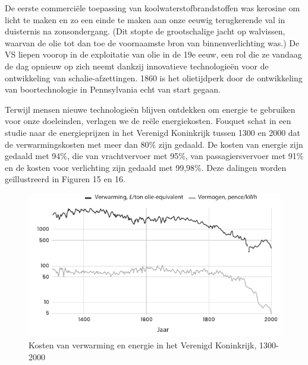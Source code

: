 \begin{blockquotebox}
    \par\vspace{1em}\noindent
    De eerste commerciële toepassing van koolwaterstofbrandstoffen was kerosine om licht te maken en zo een einde te maken aan onze eeuwig terugkerende val in duisternis na zonsondergang. (Dit stopte de grootschalige jacht op walvissen, waarvan de olie tot dan toe de voornaamste bron van binnenverlichting was.) De VS liepen voorop in de exploitatie van olie in de 19e eeuw, een rol die ze vandaag de dag opnieuw op zich neemt dankzij innovatieve technologieën voor de ontwikkeling van schalie-afzettingen. 1860 is het olietijdperk door de ontwikkeling van boortechnologie in Pennsylvania echt van start gegaan.\footnotemark
\end{blockquotebox}
\autocite{103}

Terwijl mensen nieuwe technologieën blijven ontdekken om energie te gebruiken voor onze doeleinden, verlagen we de reële energiekosten. Fouquet schat in een studie naar de energieprijzen in het Verenigd Koninkrijk tussen 1300 en 2000 dat de verwarmingskosten met meer dan 80\% zijn gedaald. De kosten van energie zijn gedaald met 94\%, die van  vrachtvervoer met 95\%, van passagiersvervoer met 91\% en de kosten voor verlichting zijn gedaald met 99,98\%. Deze dalingen worden geïllustreerd in Figuren 15 en 16.\autocite{104}

\begin{figure}[!htb]
\centering
    \includegraphics[width=\textwidth]{figures/fig15.pdf}
    \caption[Kosten van verwarming en energie in het Verenigd Koninkrijk, 1300-2000.]{Kosten van verwarming en energie in het Verenigd Koninkrijk, 1300-2000}
    \label{fig15}
\end{figure}

